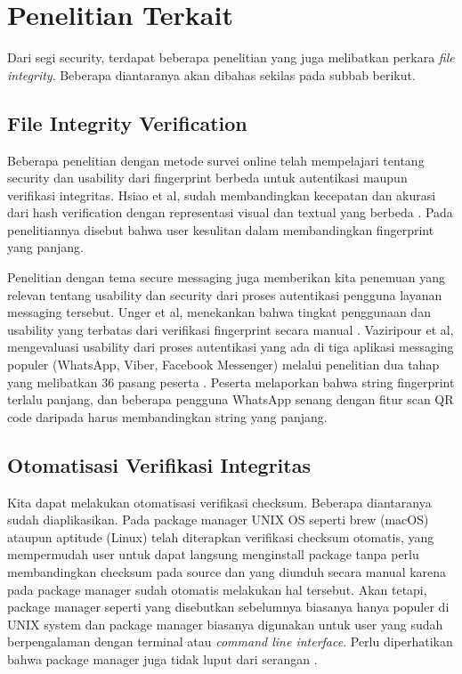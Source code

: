 \section{Penelitian Terkait}
\label{sec:penelitianterkait}

Dari segi security, terdapat beberapa penelitian yang juga melibatkan perkara \emph{file integrity}. Beberapa diantaranya akan dibahas sekilas pada subbab berikut.

\subsection{File Integrity Verification}
\label{subsec:fileintegrityverification}

Beberapa penelitian dengan metode survei online telah mempelajari tentang security dan usability dari fingerprint berbeda untuk autentikasi maupun verifikasi integritas. Hsiao et al, sudah membandingkan kecepatan dan akurasi dari hash verification dengan representasi visual dan textual yang berbeda \citep{hsiao2009}. Pada penelitiannya disebut bahwa user kesulitan dalam membandingkan fingerprint yang panjang.

Penelitian dengan tema secure messaging juga memberikan kita penemuan yang relevan tentang usability dan security dari proses autentikasi pengguna layanan messaging tersebut. Unger et al, menekankan bahwa tingkat penggunaan dan usability yang terbatas dari verifikasi fingerprint secara manual \citep{unger2015}. Vaziripour et al, mengevaluasi usability dari proses autentikasi yang ada di tiga aplikasi messaging populer (WhatsApp, Viber, Facebook Messenger) melalui penelitian dua tahap yang melibatkan 36 pasang peserta \citep{vaziripour2017}. Peserta melaporkan bahwa string fingerprint terlalu panjang, dan beberapa pengguna WhatsApp senang dengan fitur scan QR code daripada harus membandingkan string yang panjang.

\subsection{Otomatisasi Verifikasi Integritas}
\label{subsec:otoverifintegritas}

Kita dapat melakukan otomatisasi verifikasi checksum. Beberapa diantaranya sudah diaplikasikan. Pada package manager UNIX OS seperti brew (macOS) ataupun aptitude (Linux) telah diterapkan verifikasi checksum otomatis, yang mempermudah user untuk dapat langsung menginstall package tanpa perlu membandingkan checksum pada source dan yang diunduh secara manual karena pada package manager sudah otomatis melakukan hal tersebut. Akan tetapi, package manager seperti yang disebutkan sebelumnya biasanya hanya populer di UNIX system dan package manager biasanya digunakan untuk user yang sudah berpengalaman dengan terminal atau \emph{command line interface}. Perlu diperhatikan bahwa package manager juga tidak luput dari serangan \citep{cappos2008}.
